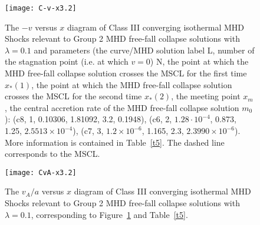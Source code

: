 \documentclass[fleqn,usenatbib]{mnras}
\begin{document}
\begin{figure}
\centering
\texttt{[image: C-v-x3.2]}
\caption{The $-v$ versus $x$ diagram of Class III converging isothermal MHD Shocks relevant to Group 2 MHD free-fall collapse solutions with $\lambda=0.1$ and parameters (the curve/MHD solution label L, number of the stagnation point (i.e. at which $v=0$) N, the point at which the MHD free-fall collapse solution crosses the MSCL for the first time $x_{*}(1)$, the point at which the MHD free-fall collapse solution crosses the MSCL for the second time $x_{*}(2)$, the meeting point $x_{m}$, the central accretion rate of the MHD free-fall collapse solution $m_{0}$): (c8, 1, 0.10306, 1.81092, 3.2, 0.1948), (c6, 2, $1.28\cdot 10^{-4}$, 0.873, 1.25, $2.5513\times 10^{-4}$), (c7, 3, $1.2\times 10^{-6}$, 1.165, 2.3, $2.3990\times 10^{-6}$). More information is contained in Table~\ref{t5}. The dashed line corresponds to the MSCL.}
\label{19}
\end{figure}



\begin{figure}
\centering
\texttt{[image: CvA-x3.2]}
\caption{The $v_{A}/a$ versus $x$ diagram of Class III converging isothermal MHD Shocks relevant to Group 2 MHD free-fall collapse solutions with $\lambda=0.1$, corresponding to Figure~\ref{19} and Table~\ref{t5}.}
\label{22}
\end{figure}



\bsp	%
\label{lastpage}
\end{document}
